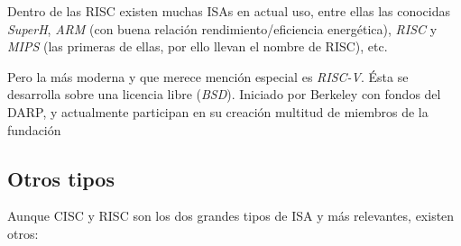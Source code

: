 \documentclass[a4paper, 11pt, titlepage]{article}
\begin{document}
            Dentro de las RISC existen muchas ISAs en actual uso, entre ellas las conocidas \textit{SuperH}, \textit{ARM} 
            (con buena relación rendimiento/eficiencia energética), \textit{RISC} y \textit{MIPS} (las primeras de ellas, por 
            ello llevan el nombre de RISC), etc.

            Pero la más moderna y que merece mención especial es \textit{RISC-V}. Ésta se desarrolla sobre una licencia 
            libre (\textit{BSD}). Iniciado por Berkeley con fondos del DARP, y actualmente participan en su creación multitud 
            de miembros de la fundación

    \subsection{Otros tipos}

        Aunque CISC y RISC son los dos grandes tipos de ISA y más relevantes, existen otros:
        
\end{document}
